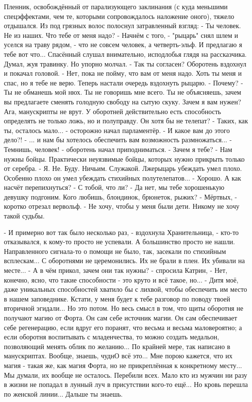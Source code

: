 Пленник, освобождённый от парализующего заклинания (с куда меньшими спецэффектами, чем те, которыми сопровождалось наложение оного), тяжело отдышался. Из под грязных волос полоснул затравленный взгляд:
 - Ты человек. Не из наших. Что тебе от меня надо?
 - Начнём с того, - "рыцарь" снял шлем и уселся на траву рядом, - что не совсем человек, а четверть-эльф. И предлагаю я тебе вот что...
Спасённый слушал внимательно, исподлобья глядя на рассказчика. Думал, жуя травинку. Но упорно молчал.
 - Так ты согласен?
Оборотень вздохнул и покачал головой.
 - Нет, пока не пойму, что вам от меня надо. Хоть ты меня и спас, но я тебе не верю.
Теперь настали очередь вздохнуть рыцарю.
 - Почему?
 - Ты не обманешь мой нюх. Ты не говоришь мне всего. Ты не объясняешь, зачем вы предлагаете сменять голодную свободу на сытую скуку. Зачем я вам нужен?
Ага, манускрипты не врут. У оборотней действительно есть способность определять не только ложь, но и полуправду. Он хотя бы не телепат?
 - Таких, как ты, осталось мало... - осторожно начал парламентёр.
 - И какое вам до этого дело?!
 - ... и нам бы хотелось обеспечить вам возможность размножаться...
 - Темнишь, человек! - оборотень начал приподниматься. - Зачем я тебе?
 - Нам нужны бойцы. Практически неуязвимые бойцы, которых нужно прикрыть только от серебра.
 - Я. Не. Буду. Ничьим. Служакой.
Лжерыцарь убеждать умел плохо. Особенно плохо он умел убеждать стихийных полутелепатов...
 - Хорошо. А как насчёт перепихнуться?
 - С тобой, что ли?
 - Да нет, мы тебе хорошенькую девушку подгоним. Кого любишь, блондинок, брюнеток, рыжих?
 - Мёртвых, - коротко отрезал вервольф. - Не хочу, чтобы у меня были дети. Никому не хочу такой судьбы.



- И примерно вот так было несколько раз, - вздохнула Хранительница, - кто-то отказывался, к кому-то просто не успевали. А большинство просто не нашли. Направленного сигнала-то о помощи не было, так, засекали по стихийным всплескам... С оборотнями не церемонились. Их не брали в плен. Их убивали на месте...
 - А в чём прикол, зачем они так нужны? - спросила Катрин, - Нет, конечно, ясно, что такие способности - это круто и всё такое, но...
 - Дитя моё, даже уникальных способностей хватило бы с лихвой, чтобы обеспечить им место в нашем заповеднике. Кстати, у меня будет к тебе разговор по поводу твоей вторичной эгидали... Но это потом. Но весь смысл в том, что щиты оборотня не получают магию от Форта. Он сам себе источник магии. Он сам обеспечивает себе регенерацию, если вдруг его поранят, что весьма и весьма маловероятно; а если оборотня воспитывать с младенчества, то можно создать медальон, позволяющий менять облик по желанию... По крайней мере, так написано в манускриптах. Вообще, знаешь, чуднО всё это... Мне порою кажется, что их магия - такая же, как магия Форта, но не прикреплённая к конкретному месту... Мы думали, их вообще не осталось. Перебили всех. Мало кто из мужчин ни разу в жизни не попадал в лунный луч в присутствии кого-то ещё... Но кровь перешла по женской линии... Дальше ты знаешь.

